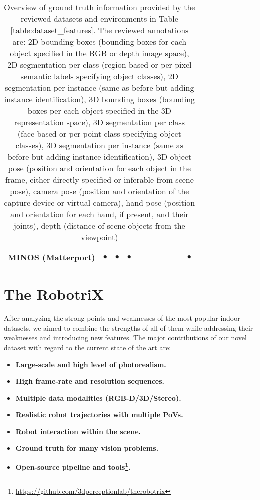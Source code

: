 \begin{table*}[!t]
{\begin{tabular}{|r|c|c|c|c|c|c|c|c|c|c|}
      MINOS (Matterport) \cite{Savva2017} & $\bullet$ & $\bullet$ & $\bullet$ & & & & & & & $\bullet$ \\
      \hline
    \end{tabular}}
    \smallskip
    \caption{Overview of ground truth information provided by the reviewed datasets and environments in Table \ref{table:dataset_features}. The reviewed annotations are: 2D bounding boxes (bounding boxes for each object specified in the RGB or depth image space), 2D segmentation per class (region-based or per-pixel semantic labels specifying object classes), 2D segmentation per instance (same as before but adding instance identification), 3D bounding boxes (bounding boxes per each object specified in the 3D representation space), 3D segmentation per class (face-based or per-point class specifying object classes), 3D segmentation per instance (same as before but adding instance identification), 3D object pose (position and orientation for each object in the frame, either directly specified or inferable from scene pose), camera pose (position and orientation of the capture device or virtual camera), hand pose (position and orientation for each hand, if present, and their joints), depth (distance of scene objects from the viewpoint)}
    \label{table:dataset_ground_truth}
  \end{table*}

\section{The RobotriX}

After analyzing the strong points and weaknesses of the most popular indoor datasets, we aimed to combine the strengths of all of them while addressing their weaknesses and introducing new features. The major contributions of our novel dataset with regard to the current state of the art are:

\begin{itemize}
	\item \textbf{Large-scale and high level of photorealism.}
  \item \textbf{High frame-rate and resolution sequences.}
  \item \textbf{Multiple data modalities (RGB-D/3D/Stereo).}
	\item \textbf{Realistic robot trajectories with multiple \acsp{PoV}.}
	\item \textbf{Robot interaction within the scene.}
  \item \textbf{Ground truth for many vision problems.}
  \item \textbf{Open-source pipeline and tools\footnote{\url{https://github.com/3dperceptionlab/therobotrix}}.}
\end{itemize}

